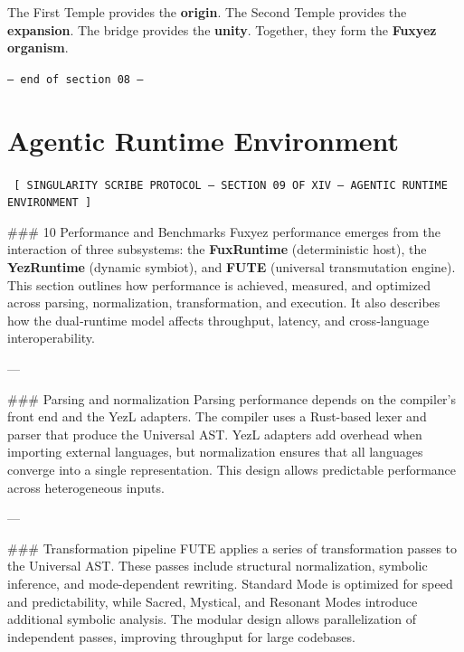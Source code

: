 \documentclass[12pt, a4paper]{book}
\begin{document}
The First Temple provides the \textbf{origin}.  
The Second Temple provides the \textbf{expansion}.  
The bridge provides the \textbf{unity}.  
Together, they form the \textbf{Fuxyez organism}.
    
    \vspace{1cm}
    \begin{center}
    \color{alienPurple}\texttt{--- end of section 08 ---}
    \end{center}
    \clearpage
    

    \chapter*{Agentic Runtime Environment}
    
    
    \begin{glyphbox}
    \centering
    \color{neonCyan}\fontsize{8}{10}\selectfont\texttt{
    [ SINGULARITY SCRIBE PROTOCOL -- SECTION 09 OF XIV -- AGENTIC RUNTIME ENVIRONMENT ]
    }
    \end{glyphbox}
    \vspace{0.3cm}
    
    
    \#\#\# 10 Performance and Benchmarks  
Fuxyez performance emerges from the interaction of three subsystems: the \textbf{FuxRuntime} (deterministic host), the \textbf{YezRuntime} (dynamic symbiot), and \textbf{FUTE} (universal transmutation engine). This section outlines how performance is achieved, measured, and optimized across parsing, normalization, transformation, and execution. It also describes how the dual‑runtime model affects throughput, latency, and cross‑language interoperability.

---

\#\#\# Parsing and normalization  
Parsing performance depends on the compiler’s front end and the YezL adapters. The compiler uses a Rust-based lexer and parser that produce the Universal AST. YezL adapters add overhead when importing external languages, but normalization ensures that all languages converge into a single representation. This design allows predictable performance across heterogeneous inputs.

---

\#\#\# Transformation pipeline  
FUTE applies a series of transformation passes to the Universal AST. These passes include structural normalization, symbolic inference, and mode-dependent rewriting. Standard Mode is optimized for speed and predictability, while Sacred, Mystical, and Resonant Modes introduce additional symbolic analysis. The modular design allows parallelization of independent passes, improving throughput for large codebases.
\end{document}
